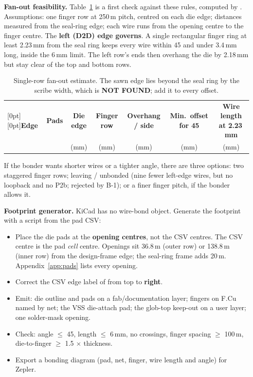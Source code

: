 \documentclass[10pt,a4paper]{article}
\newcommand\NF{\textcolor{warn}{\textbf{NOT FOUND}}}
\newcommand\hd[1]{\textbf{#1}}
\begin{document}
\textbf{Fan-out feasibility.} Table~\ref{tab:fanout} is a first check against these rules, computed by . Assumptions: one finger row at 250\,\textmu m pitch, centred on each die edge; distances measured from the seal-ring edge; each wire runs from the opening centre to the finger centre. The \textbf{left (D2D) edge governs}. A single rectangular finger ring at least 2.23\,mm from the seal ring keeps every wire within 45\textdegree{} and under 3.4\,mm long, inside the 6\,mm limit. The left row's ends then overhang the die by 2.18\,mm but stay clear of the top and bottom rows.

\begin{table}[H]
\centering\small
\begin{tabular}{@{}lcccccc@{}}
\toprule
\rowcolor{headgray}[0pt][0pt]\hd{Edge} & \hd{Pads} & \hd{Die edge} & \hd{Finger row} & \hd{Overhang / side} & \hd{Min.\ offset for 45\textdegree} & \hd{Wire length at 2.23\,mm}\\
 & & (mm) & (mm) & (mm) & (mm) & (mm)\\
\midrule

\bottomrule
\end{tabular}
\caption[Fan-out estimate]{Single-row fan-out estimate. The sawn edge lies beyond the seal ring by the scribe width, which is \NF; add it to every offset.}
\label{tab:fanout}
\end{table}

If the bonder wants shorter wires or a tighter angle, there are three options: two staggered finger rows; leaving / unbonded (nine fewer left-edge wires, but no loopback and no P2b; rejected by B-1); or a finer finger pitch, if the bonder allows it.

\textbf{Footprint generator.} KiCad has no wire-bond object. Generate the footprint with a script from the pad CSV:
\begin{itemize}
\item Place the die pads at the \textbf{opening centres}, not the CSV centres. The CSV centre is the pad \emph{cell} centre. Openings sit 36.8\,\textmu m (outer row) or 138.8\,\textmu m (inner row) from the design-frame edge; the seal-ring frame adds 20\,\textmu m. Appendix~\ref{app:pads} lists every opening.
\item Correct the CSV edge label of  from top to \textbf{right}.
\item Emit: die outline and pads on a fab/documentation layer; fingers on F.Cu named by net; the VSS die-attach pad; the glob-top keep-out on a user layer; one solder-mask opening.
\item Check: angle $\le$ 45\textdegree, length $\le$ 6\,mm, no crossings, finger spacing $\ge$ 100\,\textmu m, die-to-finger $\ge$ 1.5 $\times$ thickness.
\item Export a bonding diagram (pad, net, finger, wire length and angle) for Zepler.
\end{itemize}
\end{document}
